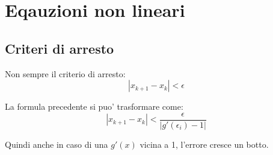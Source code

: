 \chapter{Eqauzioni non lineari}

\section{Criteri di arresto}
Non sempre il criterio di arresto:
\begin{equation*}
  |x_{k+1}-x_k|<\epsilon
\end{equation*}

La formula precedente si puo' trasformare come:
\begin{equation*}
  |x_{k+1}-x_k| < \frac{\epsilon}{|g'(\epsilon_i) - 1|}
\end{equation*}

Quindi anche in caso di una $g'(x)$ vicina a 1, l'errore cresce un botto.


